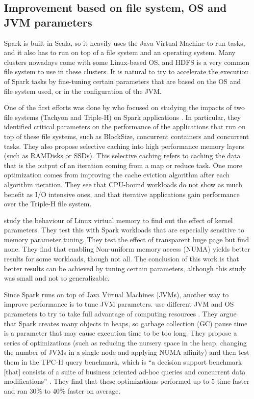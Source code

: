 \documentclass{article}
\begin{document}
\subsection{Improvement based on file system, OS and JVM parameters}

Spark is built in Scala, so it heavily uses the Java Virtual Machine to run tasks, and it also has to run on top of a file system and an operating system. Many clusters nowadays come with some Linux-based OS, and HDFS is a very common file system to use in these clusters. It is natural to try to accelerate the execution of Spark tasks by fine-tuning certain parameters that are based on the OS and file system used, or in the configuration of the JVM.

One of the first efforts was done by \citeauthor{Islam2015} who focused on studying the impacts of two file systems (Tachyon and Triple-H) on Spark applications \cite{Islam2015}. In particular, they identified critical parameters on the performance of the applications that run on top of these file systems, such as BlockSize, concurrent containers and concurrent tasks. They also propose selective caching into high performance memory layers (such as RAMDisks or SSDs). This selective caching refers to caching the data that is the output of an iteration coming from a map or reduce task. One more optimization comes from improving the cache eviction algorithm after each algorithm iteration. They see that CPU-bound workloads do not show as much benefit as I/O intensive ones, and that iterative applications gain performance over the Triple-H file system.

\citeauthor{Wang2016} \cite{Wang2016} study the behaviour of Linux virtual memory to find out the effect of kernel parameters. They test this with Spark workloads that are especially sensitive to memory parameter tuning. They test the effect of transparent huge page but find none. They find that enabling Non-uniform memory access (NUMA) yields better results for some workloads, though not all. The conclusion of this work is that better results can be achieved by tuning certain parameters, although this study was small and not so generalizable.

Since Spark runs on top of Java Virtual Machines (JVMs), another way to improve performance is to tune JVM parameters. \citeauthor{Chiba2016} use different JVM and OS parameters to try to take full advantage of computing resources \cite{Chiba2016}. They argue that Spark creates many objects in heaps, so garbage collection (GC) pause time is a parameter that may cause execution time to be too long. They propose a series of optimizations (such as reducing the nursery space in the heap, changing the number of JVMs in a single node and applying NUMA affinity) and then test them in the TPC-H query benchmark,  which is ``a decision support benchmark [that] consists of a suite of business oriented ad-hoc queries and concurrent data modifications'' \cite{TPC_H_benchmark}. They find that these optimizations performed up to 5 time faster and ran 30\% to 40\% faster on average.
\end{document}
